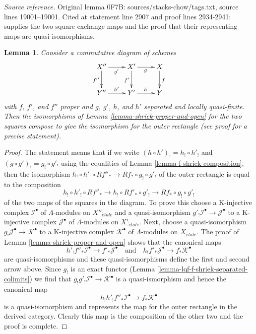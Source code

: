 \documentclass{stacks-project}
\theoremstyle{plain}
\newtheorem{lemma}[subsection]{Lemma}
\theoremstyle{definition}
\theoremstyle{remark}
\numberwithin{equation}{subsection}
\def\etale{{\acute{e}tale}}
\begin{document}
\noindent\textit{Source reference.} Original lemma 0F7B: sources/stacks-chow/tags.txt, source lines 19001--19001. Cited at statement line 2907 and proof lines 2934-2941: supplies the two square exchange maps and the proof that their representing maps are quasi-isomorphisms.\par\medskip
\begin{lemma}
\label{lemma-shriek-proper-and-open-compose-horizontal}
Consider a commutative diagram of schemes
$$
\xymatrix{
X'' \ar[r]_{g'} \ar[d]_{f''} &
X' \ar[r]_g \ar[d]_{f'} &
X \ar[d]^f \\
Y'' \ar[r]^{h'} &
Y' \ar[r]^h &
Y
}
$$
with $f$, $f'$, and $f''$ proper and
$g$, $g'$, $h$, and $h'$ separated and locally quasi-finite.
Then the isomorphisms of Lemma \ref{lemma-shriek-proper-and-open}
for the two squares compose to give the isomorphism
for the outer rectangle (see proof for a precise statement).
\end{lemma}

\begin{proof}
The statement means that if we write
$(h \circ h')_! = h_! \circ h'_!$ and
$(g \circ g')_! = g_! \circ g'_!$
using the equalities of Lemma \ref{lemma-f-shriek-composition},
then the isomorphism
$h_! \circ h'_! \circ Rf''_* \to Rf_* \circ g_! \circ g'_!$
of the outer rectangle is equal to the composition
$$
h_! \circ h'_! \circ Rf''_* \to
h_! \circ Rf'_* \circ g'_! \to
Rf_* \circ g_! \circ g'_!
$$
of the two maps of the squares in the diagram. To prove this choose
a K-injective complex $\mathcal{I}^\bullet$ of $\Lambda$-modules
on $X''_\etale$ and a quasi-isomorphism
$g'_!\mathcal{I}^\bullet \to \mathcal{J}^\bullet$
to a K-injective complex $\mathcal{J}^\bullet$ of $\Lambda$-modules
on $X'_\etale$. Next, choose a quasi-isomorphism
$g_!\mathcal{J}^\bullet \to \mathcal{K}^\bullet$
to a K-injective complex $\mathcal{K}^\bullet$ of $\Lambda$-modules
on $X_\etale$.
The proof of Lemma \ref{lemma-shriek-proper-and-open} shows that the canonical
maps
$$
h'_!f''_*\mathcal{I}^\bullet \to f'_*\mathcal{J}^\bullet
\quad\text{and}\quad
h_!f'_*\mathcal{J}^\bullet \to f_*\mathcal{K}^\bullet
$$
are quasi-isomorphisms and these quasi-isomorphisms define the
first and second arrow above. Since $g_!$ is an exact functor
(Lemma \ref{lemma-lqf-f-shriek-separated-colimits})
we find that $g_!g'_!\mathcal{I}^\bullet \to \mathcal{K}^\bullet$
is a quasi-ismorphism and hence the canonical map
$$
h_!h'_!f''_*\mathcal{I}^\bullet \to f_*\mathcal{K}^\bullet
$$
is a quasi-isomorphism and represents the map for the outer
rectangle in the derived category. Clearly this map is the
composition of the other two and the proof is complete.
\end{proof}
\end{document}
